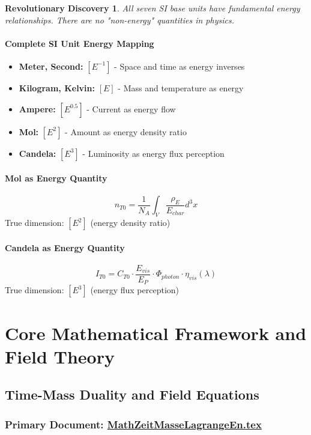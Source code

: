 \documentclass[12pt,a4paper]{report}
\newtheorem{discovery}{Revolutionary Discovery}[chapter]
\begin{document}
	\begin{discovery}
		All seven SI base units have fundamental energy relationships. There are no "non-energy" quantities in physics.
	\end{discovery}
	
	\subsubsection{Complete SI Unit Energy Mapping}
	\begin{itemize}
		\item \textbf{Meter, Second:} $[E^{-1}]$ - Space and time as energy inverses
		\item \textbf{Kilogram, Kelvin:} $[E]$ - Mass and temperature as energy
		\item \textbf{Ampere:} $[E^{0.5}]$ - Current as energy flow
		\item \textbf{Mol:} $[E^2]$ - Amount as energy density ratio
		\item \textbf{Candela:} $[E^3]$ - Luminosity as energy flux perception
	\end{itemize}
	
	\subsubsection{Mol as Energy Quantity}
	$$n_{T0} = \frac{1}{N_A} \int_V \frac{\rho_E}{E_{char}} d^3x$$
	True dimension: $[E^2]$ (energy density ratio)
	
	\subsubsection{Candela as Energy Quantity}
	$$I_{T0} = C_{T0} \cdot \frac{E_{vis}}{E_P} \cdot \Phi_{photon} \cdot \eta_{vis}(\lambda)$$
	True dimension: $[E^3]$ (energy flux perception)
	
	\chapter{Core Mathematical Framework and Field Theory}
	
	\section{Time-Mass Duality and Field Equations}
	\subsection{Primary Document: \href{https://github.com/jpascher/T0-Time-Mass-Duality/tree/main/2/pdf/MathZeitMasseLagrangeEn.pdf}{MathZeitMasseLagrangeEn.tex}}
	
\end{document}
